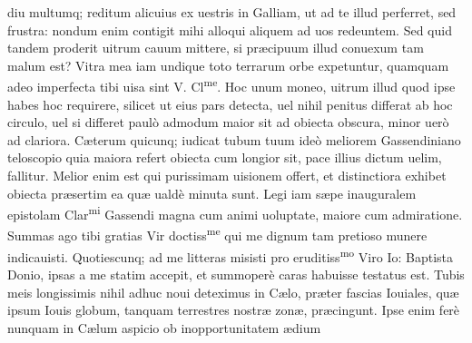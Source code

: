 \documentclass[11pt,a4paper]{article}
\begin{document}

diu multumq; reditum alicuius ex uestris in Galliam, ut ad te illud perferret, sed frustra: nondum enim contigit mihi alloqui aliquem ad uos redeuntem. Sed quid tandem proderit uitrum cauum mittere, si præcipuum illud conuexum tam malum est? Vitra mea iam undique toto terrarum orbe expetuntur, quamquam adeo imperfecta tibi uisa sint V. Cl\textsuperscript{me}. Hoc unum moneo, uitrum illud quod ipse habes hoc requirere, silicet ut eius pars detecta, uel nihil penitus differat ab hoc circulo, uel si differet paulò admodum maior sit ad obiecta obscura, minor uerò ad clariora. Cæterum quicunq; iudicat tubum tuum ideò meliorem Gassendiniano teloscopio quia maiora refert obiecta cum longior sit, pace illius dictum uelim, fallitur. Melior enim est qui purissimam uisionem offert, et distinctiora exhibet obiecta præsertim ea quæ ualdè minuta sunt. Legi iam sæpe inauguralem epistolam Clar\textsuperscript{mi} Gassendi magna cum animi uoluptate, maiore cum admiratione. Summas ago tibi gratias Vir doctiss\textsuperscript{me} qui me dignum tam pretioso munere indicauisti. Quotiescunq; ad me litteras misisti pro eruditiss\textsuperscript{mo} Viro Io: Baptista Donio, ipsas a me statim accepit, et summoperè caras habuisse testatus est. Tubis meis longissimis nihil adhuc noui deteximus in Cælo, præter fascias Iouiales, quæ ipsum Iouis globum, tanquam terrestres nostræ zonæ, præcingunt. Ipse enim ferè nunquam in Cælum aspicio ob inopportunitatem ædium

\end{document}
